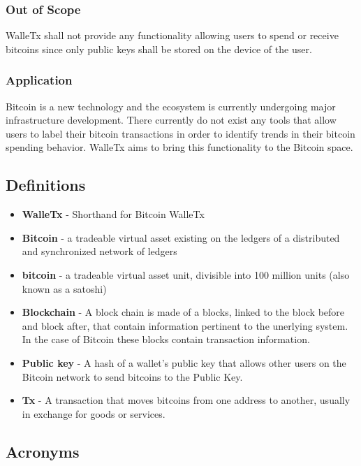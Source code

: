   \subsubsection{Out of Scope}
  WalleTx shall not provide any functionality allowing users to spend or receive bitcoins since only public keys shall be stored on the device of the user.
	
  \subsubsection{Application} 
  Bitcoin is a new technology and the ecosystem is currently undergoing major infrastructure development. There currently do not exist any tools that allow users to label their bitcoin transactions in order to identify trends in their bitcoin spending behavior. WalleTx aims to bring this functionality to the Bitcoin space.
    
	\subsection{Definitions}

	\begin{itemize}
    \item \textbf{WalleTx} - Shorthand for Bitcoin WalleTx
    \item \textbf{Bitcoin} - a tradeable virtual asset existing on the ledgers of a distributed and synchronized network of ledgers
    \item \textbf{bitcoin} - a tradeable virtual asset unit, divisible into 100 million units (also known as a satoshi) 
    \item \textbf{Blockchain} - A block chain is made of a blocks, linked to the block before and block after, that contain information pertinent to the unerlying system. In the case of Bitcoin these blocks contain transaction information.
    \item \textbf{Public key} - A hash of a wallet's public key that allows other users on the Bitcoin network to send bitcoins to the Public Key. 
    \item \textbf{Tx} - A transaction that moves bitcoins from one address to another, usually in exchange for goods or services.
	\end{itemize}

	\subsection{Acronyms}

